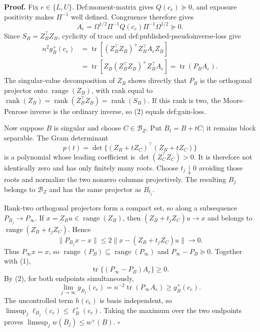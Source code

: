 \textbf{Proof.}
Fix \(e\in\{L,U\}\).  Def:moment-matrix gives \(Q(c_e)\succeq0\), and exposure positivity makes \(\Pi^{-1}\) well defined.  Congruence therefore gives
\[
 A_e=\Omega^{1/2}\Pi^{-1}Q(c_e)\Pi^{-1}\Omega^{1/2}\succeq0.
 \tag{1}
\]
Since \(S_B=Z_B^{\top}Z_B\), cyclicity of trace and def:published-pseudoinverse-loss give
\[
 \begin{aligned}
 n^2g_B^+(c_e)
 &=\operatorname{tr}\!\left[(Z_B^{\top}Z_B)^+Z_B^{\top}A_eZ_B\right]\\
 &=\operatorname{tr}\!\left[Z_B(Z_B^{\top}Z_B)^+Z_B^{\top}A_e\right]
 =\operatorname{tr}(P_BA_e).
 \end{aligned}
 \tag{2}
\]
The singular-value decomposition of \(Z_B\) shows directly that \(P_B\) is the orthogonal projector onto \(\operatorname{range}(Z_B)\), with rank equal to \(\operatorname{rank}(Z_B)=\operatorname{rank}(Z_B^{\top}Z_B)=\operatorname{rank}(S_B)\).  If this rank is two, the Moore--Penrose inverse is the ordinary inverse, so (2) equals def:gain-loss.

Now suppose \(B\) is singular and choose \(C\in\mathcal B_Z\).  Put \(B_t=B+tC\); it remains block separable.  The Gram determinant
\[
 p(t)=\det\{(Z_B+tZ_C)^{\top}(Z_B+tZ_C)\}
\]
is a polynomial whose leading coefficient is \(\det(Z_C^{\top}Z_C)>0\).  It is therefore not identically zero and has only finitely many roots.  Choose \(t_j\downarrow0\) avoiding those roots and normalize the two nonzero columns projectively.  The resulting \(B_j\) belongs to \(\mathcal B_Z\) and has the same projector as \(B_{t_j}\).

Rank-two orthogonal projectors form a compact set, so along a subsequence \(P_{B_j}\to P_\infty\).  If \(x=Z_Bu\in\operatorname{range}(Z_B)\), then \((Z_B+t_jZ_C)u\to x\) and belongs to \(\operatorname{range}(Z_B+t_jZ_C)\).  Hence
\[
 \lVert P_{B_j}x-x\rVert
 \le2\lVert x-(Z_B+t_jZ_C)u\rVert\longrightarrow0.
\]
Thus \(P_\infty x=x\), so \(\operatorname{range}(P_B)\subseteq\operatorname{range}(P_\infty)\) and \(P_\infty-P_B\succeq0\).  Together with (1),
\[
 \operatorname{tr}\{(P_\infty-P_B)A_e\}\ge0.
\]
By (2), for both endpoints simultaneously,
\[
 \lim_{j\to\infty}g_{B_j}(c_e)
 =n^{-2}\operatorname{tr}(P_\infty A_e)
 \ge g_B^+(c_e).
\]
The uncontrolled term \(h(c_e)\) is basis independent, so \(\limsup_j\ell_{B_j}(c_e)\le\ell_B^+(c_e)\).  Taking the maximum over the two endpoints proves \(\limsup_jw(B_j)\le w^+(B)\). \(\square\)